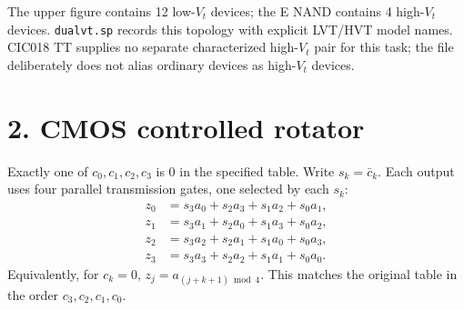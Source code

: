 \documentclass[11pt]{article}
\newcommand{\mos}[4]{\begin{scope}[shift={(#1,#2)}]
\draw (0,.24)--(0,-.24);
\draw (0,.20)--(.25,.20)--(.25,.5);
\draw (0,-.20)--(.25,-.20)--(.25,-.5);
\draw (-.16,.23)--(-.16,-.23);
\ifnum#4=1\draw (-.26,0) circle (.06);\draw (-.75,0)--(-.32,0);\else\draw (-.75,0)--(-.16,0);\fi
\node[anchor=east,font=\small] at (-.76,0) {$#3$};
\end{scope}}
\newcommand{\ground}[2]{\draw (#1,#2)--(#1,{#2-.12});\draw ({#1-.17},{#2-.12})--({#1+.17},{#2-.12});\draw ({#1-.11},{#2-.20})--({#1+.11},{#2-.20});}
\newcommand{\rail}[3]{\draw (#1,#2)--(#1,{#2+.15});\node[above,font=\small] at (#1,{#2+.15}) {$#3$};}
\newcommand{\outputnode}[3]{\fill (#1,#2) circle (.04);\draw (#1,#2)--({#1+.7},#2) node[right] {$#3$};}
\begin{document}
\begin{center}\qquad
{}\end{center}
The upper figure contains 12 low-$V_t$ devices; the E NAND contains 4 high-$V_t$ devices. \texttt{dualvt.sp} records this topology with explicit LVT/HVT model names. CIC018 TT supplies no separate characterized high-$V_t$ pair for this task; the file deliberately does not alias ordinary devices as high-$V_t$ devices.

\newpage
\section*{2. CMOS controlled rotator}
Exactly one of $c_0,c_1,c_2,c_3$ is 0 in the specified table. Write $s_k=\bar c_k$. Each output uses four parallel transmission gates, one selected by each $s_k$:
\begin{align*}
 z_0&=s_3a_0+s_2a_3+s_1a_2+s_0a_1,\\
 z_1&=s_3a_1+s_2a_0+s_1a_3+s_0a_2,\\
 z_2&=s_3a_2+s_2a_1+s_1a_0+s_0a_3,\\
 z_3&=s_3a_3+s_2a_2+s_1a_1+s_0a_0.
\end{align*}
Equivalently, for $c_k=0$, $z_j=a_{(j+k+1)\bmod4}$. This matches the original table in the order $c_3,c_2,c_1,c_0$.
\end{document}
